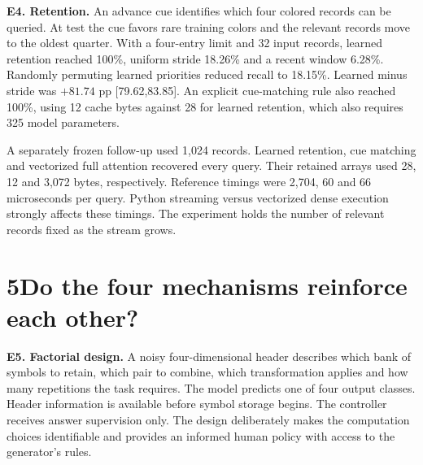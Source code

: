 \documentclass[11pt,letterpaper]{article}
\newcommand{\topic}[1]{\par\medskip\noindent\textbf{#1}\enspace}
\begin{document}
\topic{E4. Retention.} An advance cue identifies which four colored records can be queried. At test the cue favors rare training colors and the relevant records move to the oldest quarter. With a four-entry limit and 32 input records, learned retention reached 100\%, uniform stride 18.26\% and a recent window 6.28\%. Randomly permuting learned priorities reduced recall to 18.15\%. Learned minus stride was $+81.74$ pp [79.62,83.85]. An explicit cue-matching rule also reached 100\%, using 12 cache bytes against 28 for learned retention, which also requires 325 model parameters.

A separately frozen follow-up used 1,024 records. Learned retention, cue matching and vectorized full attention recovered every query. Their retained arrays used 28, 12 and 3,072 bytes, respectively. Reference timings were 2,704, 60 and 66 microseconds per query. Python streaming versus vectorized dense execution strongly affects these timings. The experiment holds the number of relevant records fixed as the stream grows.
\newpage
\section*{5\quad Do the four mechanisms reinforce each other?}
\topic{E5. Factorial design.} A noisy four-dimensional header describes which bank of symbols to retain, which pair to combine, which transformation applies and how many repetitions the task requires. The model predicts one of four output classes. Header information is available before symbol storage begins. The controller receives answer supervision only. The design deliberately makes the computation choices identifiable and provides an informed human policy with access to the generator's rules.
\end{document}
